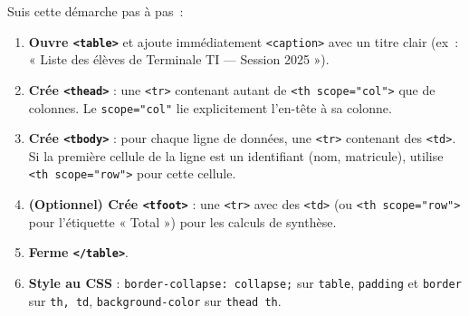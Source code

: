 \documentclass[11pt]{article}
\begin{document}
\begin{methode}
Suis cette démarche pas à pas~:
\begin{enumerate}
    \item \textbf{Ouvre \texttt{<table>}} et ajoute immédiatement \texttt{<caption>} avec un titre clair (ex~: « Liste des élèves de Terminale TI — Session 2025 »).
    \item \textbf{Crée \texttt{<thead>}} : une \texttt{<tr>} contenant autant de \texttt{<th scope="col">} que de colonnes. Le \texttt{scope="col"} lie explicitement l'en-tête à sa colonne.
    \item \textbf{Crée \texttt{<tbody>}} : pour chaque ligne de données, une \texttt{<tr>} contenant des \texttt{<td>}. Si la première cellule de la ligne est un identifiant (nom, matricule), utilise \texttt{<th scope="row">} pour cette cellule.
    \item \textbf{(Optionnel) Crée \texttt{<tfoot>}} : une \texttt{<tr>} avec des \texttt{<td>} (ou \texttt{<th scope="row">} pour l'étiquette « Total ») pour les calculs de synthèse.
    \item \textbf{Ferme \texttt{</table>}}.
    \item \textbf{Style au CSS} : \texttt{border-collapse: collapse;} sur \texttt{table}, \texttt{padding} et \texttt{border} sur \texttt{th, td}, \texttt{background-color} sur \texttt{thead th}.
\end{enumerate}
\end{methode}
\end{document}
